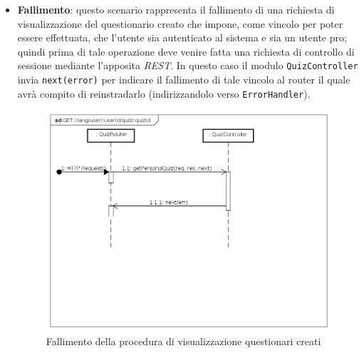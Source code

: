 \begin{itemize}
\item \textbf{Fallimento}: questo scenario rappresenta il fallimento di una richiesta di visualizzazione del questionario creato che impone, come vincolo per poter essere effettuata, che l'utente sia autenticato al sistema e sia un utente pro; quindi prima di tale operazione deve venire fatta una richiesta di controllo di sessione mediante l'apposita \textit{REST}. In questo caso il modulo \texttt{QuizController} invia \texttt{next(error)} per indicare il fallimento di tale vincolo al router il quale avrà compito di reinstradarlo (indirizzandolo verso \texttt{ErrorHandler}).
\label{Fallimento della procedura di visualizzazione questionario creato}
\begin{figure}[ht]
	\centering
	\includegraphics[scale=0.40]{UML/DiagrammiDiSequenza/Back-end/GET__lang_user_userId_quiz_quizId_failure.png}
	\caption{Fallimento della procedura di visualizzazione questionari creati}
\end{figure}
\FloatBarrier
\end{itemize}



